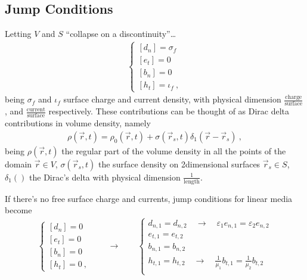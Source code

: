 \documentclass[letterpaper,10pt,english]{jupyterBook}
\begin{document}
\subsection{Jump Conditions}
\label{\detokenize{ch/principles-matter:jump-conditions}}\label{\detokenize{ch/principles-matter:classical-electromagnetism-media-jump}}
\sphinxAtStartPar
Letting \(V\) and \(S\) “collapse on a discontinuity”…
\begin{equation}\label{equation:ch/principles-matter:eq:em-jump}
\begin{split}\begin{cases}
  [ d_n ] = \sigma_f \\
  [ e_t ] = 0 \\
  [ b_n ] = 0 \\
  [ h_t ] = \iota_f \ ,
\end{cases}\end{split}
\end{equation}
\sphinxAtStartPar
being \(\sigma_f\) and \(\iota_f\) surface charge and current density, with physical dimension \(\frac{\text{charge}}{\text{surface}}\), and \(\frac{\text{current}}{\text{surface}}\) respectively. These contributions can be thought of as Dirac delta contributions in volume density, namely
\begin{equation*}
\begin{split}\rho(\vec{r},t) = \rho_0(\vec{r},t) + \sigma(\vec{r}_s,t) \delta_{1}(\vec{r}-\vec{r}_s) \ ,\end{split}
\end{equation*}
\sphinxAtStartPar
being \(\rho(\vec{r},t)\) the regular part of the volume density in all the points of the domain \(\vec{r} \in V\), \(\sigma(\vec{r}_s,t)\) the surface density on 2\sphinxhyphen{}dimensional surfaces \(\vec{r}_s \in S\), \(\delta_1()\) the Dirac’s delta with physical dimension \(\frac{1}{\text{length}}\).

\sphinxAtStartPar
If there’s no free surface charge and currents, jump conditions for linear media become
\begin{equation}\label{equation:ch/principles-matter:eq:em-jump:no-surf-density}
\begin{split}\begin{cases}
  [ d_n ] = 0 \\
  [ e_t ] = 0 \\
  [ b_n ] = 0 \\
  [ h_t ] = 0 \ ,
\end{cases}
\qquad \rightarrow \qquad
\begin{cases}
  d_{n,1} = d_{n,2}  \quad \rightarrow \quad \varepsilon_1 e_{n,1} = \varepsilon_2 e_{n,2} \\
  e_{t,1} = e_{t,2}  \\
  b_{n,1} = b_{n,2}  \\
  h_{t,1} = h_{t,2}  \quad \rightarrow \quad \frac{1}{\mu_1} b_{t,1} = \frac{1}{\mu_2} b_{t,2} \\
\end{cases}
\end{split}
\end{equation}
\sphinxstepscope
\end{document}
